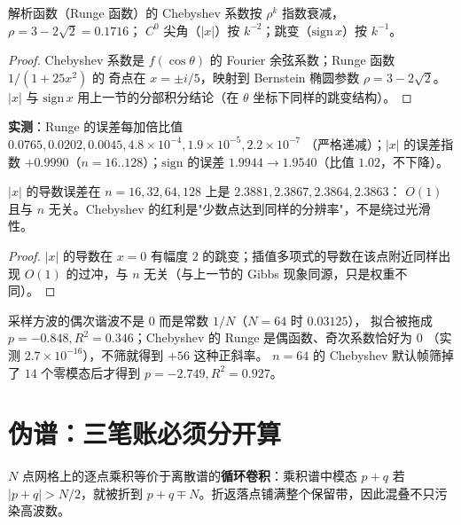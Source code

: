\begin{theorem}
解析函数（Runge 函数）的 Chebyshev 系数按 $\rho^k$ 指数衰减，$\rho=3-2\sqrt2=0.1716$；
$C^0$ 尖角（$|x|$）按 $k^{-2}$；跳变（$\mathrm{sign}\,x$）按 $k^{-1}$。
\end{theorem}

\begin{proof}
Chebyshev 系数是 $f(\cos\theta)$ 的 Fourier 余弦系数；Runge 函数 $1/(1+25x^2)$ 的
奇点在 $x=\pm i/5$，映射到 Bernstein 椭圆参数 $\rho=3-2\sqrt2$。$|x|$ 与 $\mathrm{sign}\,x$
用上一节的分部积分结论（在 $\theta$ 坐标下同样的跳变结构）。
\end{proof}

\textbf{实测}：Runge 的误差每加倍比值 $0.0765,0.0202,0.0045,4.8\times10^{-4},1.9\times10^{-5},2.2\times10^{-7}$
（严格递减）；$|x|$ 的误差指数 $+0.9990$（$n=16..128$）；$\mathrm{sign}$ 的误差
$1.9944\to1.9540$（比值 $1.02$，不下降）。

\begin{corollary}[非光滑数据换基也没用]
$|x|$ 的导数误差在 $n=16,32,64,128$ 上是 $2.3881,2.3867,2.3864,2.3863$：
$O(1)$ 且与 $n$ 无关。Chebyshev 的红利是"少数点达到同样的分辨率"，不是绕过光滑性。
\end{corollary}

\begin{proof}
$|x|$ 的导数在 $x=0$ 有幅度 $2$ 的跳变；插值多项式的导数在该点附近同样出现
$O(1)$ 的过冲，与 $n$ 无关（与上一节的 Gibbs 现象同源，只是权重不同）。
\end{proof}

\begin{remark}[零点模态会伪造斜率]
采样方波的偶次谐波不是 $0$ 而是常数 $1/N$（$N=64$ 时 $0.03125$），
拟合被拖成 $p=-0.848,R^2=0.346$；Chebyshev 的 Runge 是偶函数、奇次系数恰好为 $0$
（实测 $2.7\times10^{-16}$），不筛就得到 $+56$ 这种正斜率。
$n=64$ 的 Chebyshev 默认帧筛掉了 $14$ 个零模态后才得到 $p=-2.749,R^2=0.927$。
\end{remark}

\section{伪谱：三笔账必须分开算}

\begin{theorem}[混叠的落点]
$N$ 点网格上的逐点乘积等价于离散谱的\textbf{循环卷积}：乘积谱中模态 $p+q$ 若
$|p+q|>N/2$，就被折到 $p+q\mp N$。折返落点铺满整个保留带，因此混叠不只污染高波数。
\end{theorem}

